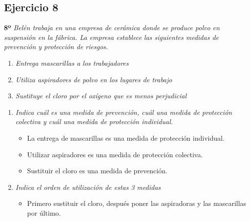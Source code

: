 \documentclass{article}
\begin{document}
      \newpage
        \subsection{Ejercicio 8}
          \textbf{8º} \textit{ Belén trabaja en una empresa de cerámica donde se produce polvo en suspensión en la fábrica. La empresa establece las siguientes medidas de prevención y protección de riesgos.}
          \\
          \begin{enumerate}[label=(\alph*)]
            \item \textit{Entrega mascarillas a los trabajadores}

            \item \textit{Utiliza aspiradores de polvo en los lugares de trabajo}

            \item \textit{Sustituye el cloro por el oxígeno que es menos perjudicial}
          \end{enumerate}
          
          \begin{enumerate}[label=(\alph*)]
            \item \textit{Indica cuál es una medida de prevención, cuál una medida de protección colectiva y cuál una medida de protección individual.}
              \begin{itemize}
                \item La entrega de mascarillas es una medida de protección individual.
                \item Utilizar aspiradores es una medida de protección colectiva.
                \item Sustituir el cloro es una medida de prevención.
              \end{itemize}
            \item \textit{Indica el orden de utilización de estas 3 medidas}
              \begin{itemize}
                \item Primero sustituir el cloro, después poner las aspiradoras y las mascarillas por último.
              \end{itemize}
          \end{enumerate}
  
        \newpage
\end{document}
